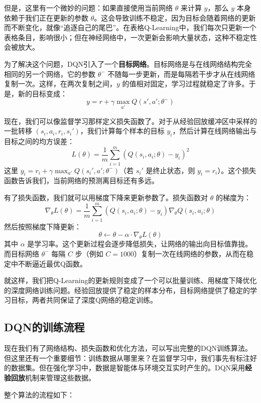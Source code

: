 \documentclass[lang=cn,zihao=-4,a4paper,fontset=windows]{beautybook}
\begin{document}
但是，这里有一个微妙的问题：如果直接使用当前网络 $\theta$ 来计算 $y$，那么 $y$ 本身依赖于我们正在更新的参数 $\theta$。这会导致训练不稳定，因为目标会随着网络的更新而不断变化，就像“追逐自己的尾巴”。在表格Q-Learning中，我们每次只更新一个表格条目，影响很小；但在神经网络中，一次更新会影响大量状态，这种不稳定性会被放大。

为了解决这个问题，DQN引入了一个\textbf{目标网络}。目标网络是与在线网络结构完全相同的另一个网络，它的参数 $\theta^-$ 不随每一步更新，而是每隔若干步才从在线网络复制一次。这样，在两次复制之间，$y$ 的值相对固定，学习过程就稳定了许多。于是，新的目标变成：
\[
y = r + \gamma \max_{a'} Q(s',a'; \theta^-)
\]

现在，我们可以像监督学习那样定义损失函数了。对于从经验回放缓冲区中采样的一批转移 $(s_i, a_i, r_i, s_i')$，我们计算每个样本的目标 $y_i$，然后计算在线网络输出与目标之间的均方误差：
\[
L(\theta) = \frac{1}{m} \sum_{i=1}^{m} \left( Q(s_i, a_i; \theta) - y_i \right)^2
\]
这里 $y_i = r_i + \gamma \max_{a'} Q(s_i', a'; \theta^-)$（若 $s_i'$ 是终止状态，则 $y_i = r_i$）。这个损失函数告诉我们，当前网络的预测离目标还有多远。

有了损失函数，我们就可以用梯度下降来更新参数了。损失函数对 $\theta$ 的梯度为：
\[
\nabla_{\theta} L(\theta) = \frac{1}{m} \sum_{i=1}^{m} \left( Q(s_i, a_i; \theta) - y_i \right) \nabla_{\theta} Q(s_i, a_i; \theta)
\]
然后按照梯度下降更新：
\[
\theta \leftarrow \theta - \alpha \cdot \nabla_{\theta} L(\theta)
\]
其中 $\alpha$ 是学习率。这个更新过程会逐步降低损失，让网络的输出向目标值靠拢。而目标网络 $\theta^-$ 每隔 $C$ 步（例如 $C=1000$）复制一次在线网络的参数，从而在稳定中不断逼近最优Q函数。

就这样，我们把Q-Learning的更新规则变成了一个可以批量训练、用梯度下降优化的深度网络训练问题。经验回放提供了稳定的样本分布，目标网络提供了稳定的学习目标，两者共同保证了深度Q网络的稳定训练。

\subsection{DQN的训练流程}

现在我们有了网络结构、损失函数和优化方法，可以写出完整的DQN训练算法。但这里还有一个重要细节：训练数据从哪里来？在监督学习中，我们事先有标注好的数据集。但在强化学习中，数据是智能体与环境交互实时产生的。DQN采用\textbf{经验回放}机制来管理这些数据。

整个算法的流程如下：
\end{document}

